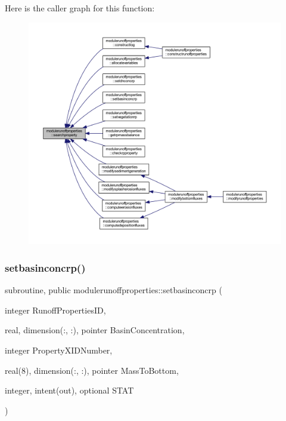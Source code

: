 Here is the caller graph for this function\+:\nopagebreak
\begin{figure}[H]
\begin{center}
\leavevmode
\includegraphics[width=350pt]{namespacemodulerunoffproperties_ab2a49fca4ff961c8b2dfd016b005ed06_icgraph}
\end{center}
\end{figure}
\mbox{\label{namespacemodulerunoffproperties_a5a59647a877b86974489e072330e3b92}} 
\subsubsection{\texorpdfstring{setbasinconcrp()}{setbasinconcrp()}}
{\footnotesize\ttfamily subroutine, public modulerunoffproperties\+::setbasinconcrp (\begin{DoxyParamCaption}\item[{integer}]{Runoff\+Properties\+ID,  }\item[{real, dimension(\+:, \+:), pointer}]{Basin\+Concentration,  }\item[{integer}]{Property\+X\+I\+D\+Number,  }\item[{real(8), dimension(\+:, \+:), pointer}]{Mass\+To\+Bottom,  }\item[{integer, intent(out), optional}]{S\+T\+AT }\end{DoxyParamCaption})}

